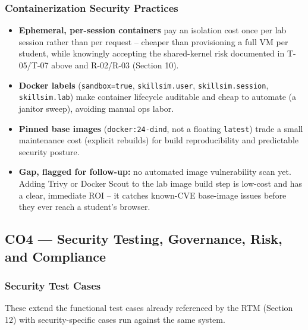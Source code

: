 \documentclass[11pt]{article}
\begin{document}
\subsubsection{Containerization Security Practices}
\begin{itemize}
\item \textbf{Ephemeral, per-session containers} pay an isolation
      cost once per lab session rather than per request -- cheaper
      than provisioning a full VM per student, while knowingly
      accepting the shared-kernel risk documented in T-05/T-07 above
      and R-02/R-03 (Section 10).
\item \textbf{Docker labels} (\texttt{sandbox=true},
      \texttt{skillsim.user}, \texttt{skillsim.session},
      \texttt{skillsim.lab}) make container lifecycle auditable and
      cheap to automate (a janitor sweep), avoiding manual ops labor.
\item \textbf{Pinned base images} (\texttt{docker:24-dind}, not a
      floating \texttt{latest}) trade a small maintenance cost
      (explicit rebuilds) for build reproducibility and predictable
      security posture.
\item \textbf{Gap, flagged for follow-up:} no automated image
      vulnerability scan yet. Adding Trivy or Docker Scout to the lab
      image build step is low-cost and has a clear, immediate ROI --
      it catches known-CVE base-image issues before they ever reach a
      student's browser.
\end{itemize}

\subsection{CO4 --- Security Testing, Governance, Risk, and Compliance}

\subsubsection{Security Test Cases}
These extend the functional test cases already referenced by the RTM
(Section 12) with security-specific cases run against the same
system.
\end{document}
